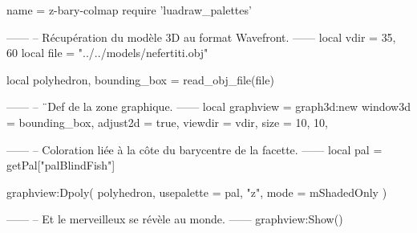 \documentclass{standalone}
\begin{document}
\begin{luadraw}{name = z-bary-colmap}
require 'luadraw_palettes'

------
-- Récupération du modèle 3D au format Wavefront.
------
local vdir = {35, 60}
local file = "../../models/nefertiti.obj"

local polyhedron, bounding_box = read_obj_file(file)

------
-- ¨Def de la zone graphique.
------
local graphview = graph3d:new{
  window3d = bounding_box,
  adjust2d = true,
  viewdir  = vdir,
  size     = {10, 10},
}

------
-- Coloration liée à la côte du barycentre de la facette.
------
local pal = getPal["palBlindFish"]

graphview:Dpoly(
  polyhedron, 
  {
    usepalette = {pal, "z"},
    mode       = mShadedOnly
  }
)

------
-- Et le merveilleux se révèle au monde.
------
graphview:Show()
\end{luadraw}
\end{document}
